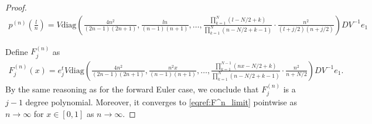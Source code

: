 \documentclass{article}
\theoremstyle{definition}
\newcommand{\pr}[1]{ \left( #1 \right) }
\begin{document}
\begin{proof}
    \begin{align*}
        p^{(n)}\pr{\frac{l}{n}} 
        = V \text{diag}\pr{ \frac{4n^2}{(2n-1)(2n+1)}, \frac{ ln}{(n-1)(n+1)}, \dots, \frac{\prod_{k=1}^{N}\pr{ l - N/2 + k } }{{\prod_{k=1}^{N}\pr{ n - N/2 + k - 1}}} 
        \cdot \frac{n^2}{(l+j/2)(n+j/2)} } D V^{-1} e_1
    \end{align*}

     Define $F_j^{(n)}$ as 
     \begin{align*}
        F_j^{(n)}(x) 
        = e_j^tV \text{diag}\pr{ \frac{4n^2 }{(2n-1)(2n+1)}, 
        \frac{n^2x}{(n-1)(n+1)},
        \dots,
        \frac{\prod_{k=1}^{N-1}\pr{ nx - N/2 + k } }{{\prod_{k=1}^{N}\pr{ n - N/2 + k - 1}}} \cdot
        \frac{n^2}{n+N/2}} D V^{-1} e_1.
     \end{align*}
     By the same reasoning as for the forward Euler case, we conclude that $F_j^{(n)}$ is a $j-1$ degree polynomial. Moreover, it converges to \eqref{eqref:F^n_limit} pointwise as $n \to \infty$ for $x \in [0,1]$ as $n \to \infty$.


\end{proof}
\end{document}
